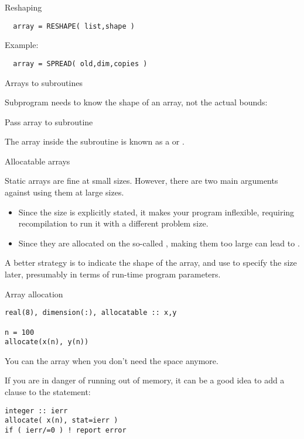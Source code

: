  {Reshaping}

\begin{verbatim}
  array = RESHAPE( list,shape )
\end{verbatim}
Example:

\begin{verbatim}
  array = SPREAD( old,dim,copies )
\end{verbatim}

 {Arrays to subroutines}

Subprogram needs to know the shape of an array, not the actual bounds:

\begin{block}{Pass array to subroutine}
  \label{sl:farray-pass1d}
\end{block}

The array inside the subroutine is known as a
 or
.

 {Allocatable arrays}
\label{sec:allocatable}

Static arrays are fine at small sizes. However, 
there are two main arguments against using them at large sizes.
\begin{itemize}
\item Since the size is explicitly stated, it makes your program
  inflexible, requiring recompilation to run it with a different
  problem size.
\item Since they are allocated on the so-called ,
  making them too large can lead to .
\end{itemize}

A better strategy is to indicate the shape of the array, and use
 to specify
the size later, presumably in terms of run-time program parameters.

\begin{block}{Array allocation}
  \label{sl:farray-alloc}
\begin{verbatim}
real(8), dimension(:), allocatable :: x,y

n = 100
allocate(x(n), y(n))
\end{verbatim}
You can  the array when you don't need the
space anymore.
\end{block}

If you are in danger of running out of memory, it can be a good idea
to add a  clause to the  statement:
\begin{verbatim}
integer :: ierr
allocate( x(n), stat=ierr )
if ( ierr/=0 ) ! report error
\end{verbatim}

